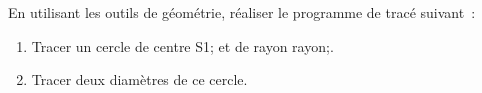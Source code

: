 \documentclass[exercice]{thedocument}%
\begin{document}
%
En utilisant les outils de géométrie, réaliser le programme de tracé suivant~:
\begin{enumerate}
    \item Tracer un cercle de centre \<S1; et de rayon \<rayon;.
    \item Tracer deux diamètres de ce cercle.
\end{enumerate}\vskip200pt
\end{document}
